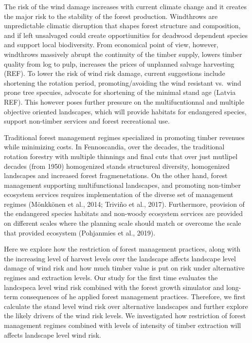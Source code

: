\documentclass[]{elsarticle} %
\begin{document}
The risk of the wind damage increases with current climate change and it
creates the major risk to the stability of the forest production.
Windthrows are unpredictable climatic disruption that shapes forest
structure and composition, and if left unsalvaged could create
opportiunities for deadwood dependent species and support local
biodiversity. From economical point of view, however, windthrows
massively abrupt the continuity of the timber supply, lowers timber
quality from log to pulp, increases the prices of unplanned salvage
harvesting (REF). To lower the risk of wind risk damage, current
suggestions include shortening the rotation period, promoting/avoiding
the wind resistant vs.~wind prone tree specuies, advocate for shortening
of the minimal stand age (Latvia REF). This however poses further
pressure on the multifucntionnal and multiple objective oriented
landscapes, which will provide habitats for endangered species, support
non-timber services and forest recreational use.

Traditional forest management regimes specialized in promoting timber
revenues while minimizing costs. In Fennoscandia, over the decades, the
traditional rotation forestry with multiple thinnings and final cuts
that over just mutlipel decades (from 1950) homogenized stands
structureal diversity, homogenized landscapes and increased forest
fragmenetations. On the other hand, forest management supporting
multifunctional landscapes, and promoting non-timber ecosystem services
requires implementation of the diverse set of management regimes
(Mönkkönen et al., 2014; Triviño et al., 2017). Furthermore, provision
of the endangered species habitats and non-woody ecosystem services are
provided on different scales where the planning scale should match or
overcome the scale that provided ecosystem (Pohjanmies et al., 2019).

Here we explore how the restriction of forest management practices,
along with the increasing level of harvest levels over the landscape
affects landscape level damage of wind risk and how much timber value is
put on risk under alternative regimes and extraction levels. Our study
for the first time evaluates the landcspeca level wind risk combined
with the forest growth simulator and long-term consequences of he
applied forest management practices. Therefore, we first calculate the
stand level wind risk over alternative landscapes and further explore
the likely drivers of the wind risk levels. We investigated how
restriction of forest management regimes combined with levels of
intensity of timber extraction will affects landscape level wind risk.
\end{document}
